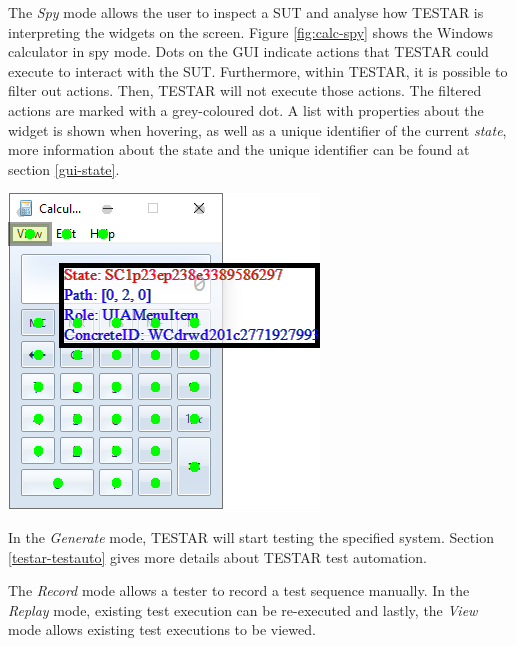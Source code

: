 The \emph{Spy} mode allows the user to inspect a SUT and analyse how TESTAR is interpreting the widgets on the screen. Figure \ref{fig:calc-spy} shows the Windows calculator in spy mode. Dots on the GUI indicate actions that TESTAR could execute to interact with the SUT. Furthermore, within TESTAR, it is possible to filter out actions. Then, TESTAR will not execute those actions. The filtered actions are marked with a grey-coloured dot. A list with properties about the widget is shown when hovering, as well as a unique identifier of the current \emph{state}, more information about the state and the unique identifier can be found at section \ref{gui-state}.\par

\bigskip
\begingroup
\captionsetup{type=figure}
\includegraphics{pics/calc-state.png}
\label{fig:calc-spy}
\endgroup

In the \emph{Generate} mode, TESTAR will start testing the specified system. Section \ref{testar-testauto} gives more details about TESTAR test automation.

The \emph{Record} mode allows a tester to record a test sequence manually. In the \emph{Replay} mode, existing test execution can be re-executed and lastly, the \emph{View} mode allows existing test executions to be viewed.

